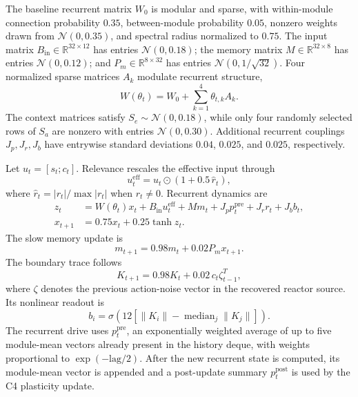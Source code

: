 \documentclass[aps,pre,preprint,superscriptaddress,nofootinbib]{revtex4-2}
\newcommand{\Bin}{B_{\mathrm{in}}}
\begin{document}
The baseline recurrent matrix $W_0$ is modular and sparse, with within-module connection probability $0.35$, between-module probability $0.05$, nonzero weights drawn from $\mathcal N(0,0.35)$, and spectral radius normalized to $0.75$. The input matrix $\Bin\in\mathbb{R}^{32\times12}$ has entries $\mathcal N(0,0.18)$; the memory matrix $M\in\mathbb{R}^{32\times8}$ has entries $\mathcal N(0,0.12)$; and $P_m\in\mathbb{R}^{8\times32}$ has entries $\mathcal N(0,1/\sqrt{32})$. Four normalized sparse matrices $A_k$ modulate recurrent structure,
\begin{equation}
W(\theta_t)=W_0+\sum_{k=1}^{4}\theta_{t,k}A_k.
\end{equation}
The context matrices satisfy $S_e\sim\mathcal N(0,0.18)$, while only four randomly selected rows of $S_a$ are nonzero with entries $\mathcal N(0,0.30)$. Additional recurrent couplings $J_p,J_r,J_b$ have entrywise standard deviations $0.04$, $0.025$, and $0.025$, respectively.

Let $u_t=[s_t;c_t]$. Relevance rescales the effective input through
\begin{equation}
 u_t^{\mathrm{eff}}=u_t\odot(1+0.5\,\hat r_t),
\end{equation}
where $\hat r_t=|r_t|/\max|r_t|$ when $r_t\neq0$. Recurrent dynamics are
\begin{align}
 z_t &= W(\theta_t)x_t+\Bin u_t^{\mathrm{eff}}+Mm_t+J_pp_t^{\mathrm{pre}}+J_rr_t+J_bb_t,\\
 x_{t+1} &=0.75x_t+0.25\tanh z_t.
\end{align}
The slow memory update is
\begin{equation}
 m_{t+1}=0.98m_t+0.02P_mx_{t+1}.
\end{equation}
The boundary trace follows
\begin{equation}
 K_{t+1}=0.98K_t+0.02\,c_t\zeta_{t-1}^{T},
\end{equation}
where $\zeta$ denotes the previous action-noise vector in the recovered reactor source. Its nonlinear readout is
\begin{equation}
 b_i=\sigma\!\left(12\left[\|K_i\|-\operatorname{median}_j\|K_j\|\right]\right).
\end{equation}
The recurrent drive uses $p_t^{\mathrm{pre}}$, an exponentially weighted average of up to five module-mean vectors already present in the history deque, with weights proportional to $\exp(-\mathrm{lag}/2)$. After the new recurrent state is computed, its module-mean vector is appended and a post-update summary $p_t^{\mathrm{post}}$ is used by the C4 plasticity update.
\end{document}
